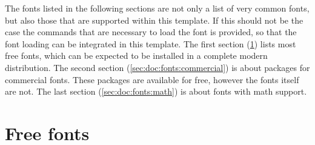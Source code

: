 The fonts listed in the following sections are not only a list of very common fonts, but also those that are supported within this template. If this should not be the case the commands that are necessary to load the font is provided, so that the font loading can be integrated in this template. The first section (\ref{sec:doc:fonts:free}) lists most free fonts, which can be expected to be installed in a complete modern \latex distribution. The second section (\ref{sec:doc:fonts:commercial}) is about packages for commercial fonts. These packages are available for free, however the fonts itself are not. The last section (\ref{sec:doc:fonts:math}) is about fonts with math support.

\section{Free fonts}
\label{sec:doc:fonts:free}

